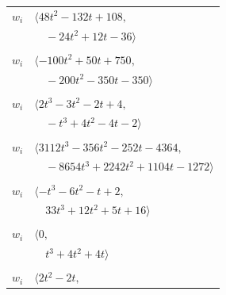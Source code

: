 \documentclass[11pt]{article}
\begin{document}
\begin{longtable}{@{}ll@{}}
$w_i$ & $\langle 48t^{2}-132t+108,$\\
 & $\quad -24t^{2}+12t-36\rangle$\\
\addlinespace[2pt]
\multicolumn{2}{@{}p{0.97\textwidth}@{}}{$i=31$, $D_i=1$, $\rho_{ij}$: $0{:}2, \allowbreak 1{:}1, \allowbreak 2{:}3, \allowbreak 7{:}3, \allowbreak 9{:}1, \allowbreak 10{:}3, \allowbreak 11{:}1, \allowbreak 12{:}3, \allowbreak 20{:}2, \allowbreak 21{:}2, \allowbreak 35{:}2, \allowbreak 37{:}1$}\\
$w_i$ & $\langle -100t^{2}+50t+750,$\\
 & $\quad -200t^{2}-350t-350\rangle$\\
\addlinespace[2pt]
\multicolumn{2}{@{}p{0.97\textwidth}@{}}{$i=32$, $D_i=1$, $\rho_{ij}$: $2{:}3, \allowbreak 21{:}3, \allowbreak 27{:}3, \allowbreak 41{:}1$}\\
$w_i$ & $\langle 2t^{3}-3t^{2}-2t+4,$\\
 & $\quad -t^{3}+4t^{2}-4t-2\rangle$\\
\addlinespace[2pt]
\multicolumn{2}{@{}p{0.97\textwidth}@{}}{$i=33$, $D_i=1$, $\rho_{ij}$: $1{:}1, \allowbreak 3{:}3, \allowbreak 8{:}1, \allowbreak 9{:}3, \allowbreak 13{:}1, \allowbreak 17{:}3, \allowbreak 20{:}3, \allowbreak 22{:}3, \allowbreak 23{:}3, \allowbreak 27{:}2, \allowbreak 29{:}3$}\\
$w_i$ & $\langle 3112t^{3}-356t^{2}-252t-4364,$\\
 & $\quad -8654t^{3}+2242t^{2}+1104t-1272\rangle$\\
\addlinespace[2pt]
\multicolumn{2}{@{}p{0.97\textwidth}@{}}{$i=34$, $D_i=1$, $\rho_{ij}$: $12{:}1, \allowbreak 14{:}2, \allowbreak 18{:}3, \allowbreak 25{:}3, \allowbreak 26{:}2, \allowbreak 35{:}2, \allowbreak 37{:}2, \allowbreak 39{:}2$}\\
$w_i$ & $\langle -t^{3}-6t^{2}-t+2,$\\
 & $\quad 33t^{3}+12t^{2}+5t+16\rangle$\\
\addlinespace[2pt]
\multicolumn{2}{@{}p{0.97\textwidth}@{}}{$i=35$, $D_i=1$, $\rho_{ij}$: $0{:}2, \allowbreak 10{:}2, \allowbreak 23{:}2, \allowbreak 31{:}2, \allowbreak 34{:}2$}\\
$w_i$ & $\langle 0,$\\
 & $\quad t^{3}+4t^{2}+4t\rangle$\\
\addlinespace[2pt]
\multicolumn{2}{@{}p{0.97\textwidth}@{}}{$i=36$, $D_i=1$, $\rho_{ij}$: $3{:}2, \allowbreak 7{:}1, \allowbreak 12{:}1, \allowbreak 27{:}2, \allowbreak 30{:}2$}\\
$w_i$ & $\langle 2t^{2}-2t,$\\

\end{longtable}
\end{document}
